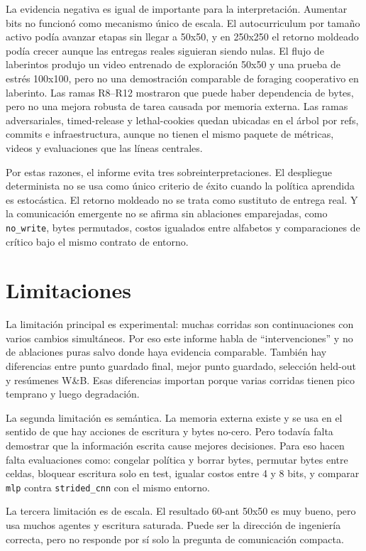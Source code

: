 \documentclass[11pt,a4paper]{article}
\newcommand{\run}[1]{\nolinkurl{#1}}
\begin{document}
La evidencia negativa es igual de importante para la interpretación. Aumentar bits no funcionó como mecanismo único de escala. El autocurriculum por tamaño activo podía avanzar etapas sin llegar a 50x50, y en 250x250 el retorno moldeado podía crecer aunque las entregas reales siguieran siendo nulas. El flujo de laberintos produjo un video entrenado de exploración 50x50 y una prueba de estrés 100x100, pero no una demostración comparable de foraging cooperativo en laberinto. Las ramas R8--R12 mostraron que puede haber dependencia de bytes, pero no una mejora robusta de tarea causada por memoria externa. Las ramas adversariales, timed-release y lethal-cookies quedan ubicadas en el árbol por refs, commits e infraestructura, aunque no tienen el mismo paquete de métricas, videos y evaluaciones que las líneas centrales.

Por estas razones, el informe evita tres sobreinterpretaciones. El despliegue determinista no se usa como único criterio de éxito cuando la política aprendida es estocástica. El retorno moldeado no se trata como sustituto de entrega real. Y la comunicación emergente no se afirma sin ablaciones emparejadas, como \run{no_write}, bytes permutados, costos igualados entre alfabetos y comparaciones de crítico bajo el mismo contrato de entorno.

\section{Limitaciones}

La limitación principal es experimental: muchas corridas son continuaciones con varios cambios simultáneos. Por eso este informe habla de ``intervenciones'' y no de ablaciones puras salvo donde haya evidencia comparable. También hay diferencias entre punto guardado final, mejor punto guardado, selección held-out y resúmenes W\&B. Esas diferencias importan porque varias corridas tienen pico temprano y luego degradación.

La segunda limitación es semántica. La memoria externa existe y se usa en el sentido de que hay acciones de escritura y bytes no-cero. Pero todavía falta demostrar que la información escrita cause mejores decisiones. Para eso hacen falta evaluaciones como: congelar política y borrar bytes, permutar bytes entre celdas, bloquear escritura solo en test, igualar costos entre 4 y 8 bits, y comparar \run{mlp} contra \run{strided_cnn} con el mismo entorno.

La tercera limitación es de escala. El resultado 60-ant 50x50 es muy bueno, pero usa muchos agentes y escritura saturada. Puede ser la dirección de ingeniería correcta, pero no responde por sí solo la pregunta de comunicación compacta.
\end{document}
